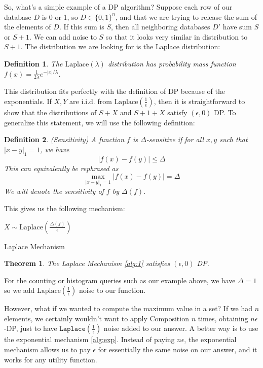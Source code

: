 \documentclass[11pt]{article}
\newtheorem{theorem}{Theorem}
\newtheorem{defn}{Definition}
\begin{document}
So, what's a simple example of a DP algorithm? Suppose each row of our database $D$ is 0 or 1, so $D \in \{0, 1\}^n$, and that we are trying to release the sum of the elements of $D$. If this sum is $S$, then all neighboring databases $D'$ have sum $S$ or $S+1$. We can add noise to $S$ so that it looks very similar in distribution to $S+1$. The distribution we are looking for is the Laplace distribution:
\begin{defn}
The $\text{Laplace}(\lambda)$ distribution has probability mass function $f(x) = \frac{1}{2\lambda}e^{-|x|/\lambda}$.
\end{defn}
This distribution fits perfectly with the definition of DP because of the exponentials. If $X,Y$ are i.i.d. from $\text{Laplace}\left(\frac{1}{\epsilon}\right)$, then it is straightforward to show that the distributions of $S+X$ and $S+1+X$ satisfy $(\epsilon, 0)$ DP. To generalize this statement, we will use the following definition:
\begin{defn}
(Sensitivity) A function $f$ is $\Delta$-sensitive if for all $x,y$ such that $|x-y|_1 = 1$, we have 
\[
|f(x) - f(y)| \leq \Delta
\]
This can equivalently be rephrased as 
\[
\max_{|x-y|_1=1}|f(x) - f(y)| = \Delta
\]
We will denote the sensitivity of $f$ by $\Delta(f)$.
\end{defn}
This gives us the following mechanism:

\begin{algorithm}\label{alg:1}
\SetAlgoLined
{}
$X \sim \text{Laplace}\left(\frac{\Delta(f)}{\epsilon}\right)$\;
\caption{Laplace Mechanism}
\end{algorithm}

\begin{theorem}
The Laplace Mechanism \ref{alg:1} satisfies $(\epsilon, 0)$ DP.
\end{theorem}
For the counting or histogram queries such as our example above, we have $\Delta = 1$ so we add $\text{Laplace}\left(\frac{1}{\epsilon}\right)$ noise to our function.

However, what if we wanted to compute the maximum value in a set? If we had $n$ elements, we certainly wouldn't want to apply Composition $n$ times, obtaining $n\epsilon$-DP, just to have $\texttt{Laplace}\left(\frac{1}{\epsilon}\right)$ noise added to our answer. A better way is to use the exponential mechanism \ref{alg:exp}. Instead of paying $n\epsilon$, the exponential mechanism allows us to pay $\epsilon$ for essentially the same noise on our answer, and it works for any utility function.
\end{document}
